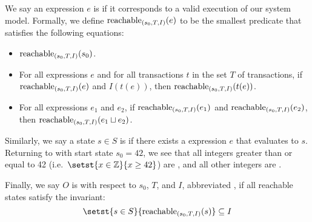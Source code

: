 We say an expression $e$ is  if it corresponds to a
valid execution of our system model. Formally, we define
$\text{reachable}_{(s_0, T, I)}(e)$ to be the smallest predicate that satisfies the
following equations:
\begin{itemize}
  \item
    $\text{reachable}_{(s_0, T, I)}(s_0)$.
  \item
    For all expressions $e$ and for all transactions $t$ in the set $T$ of
    transactions, if $\text{reachable}_{(s_0, T, I)}(e)$ and $I(t(e))$, then
    $\text{reachable}_{(s_0, T, I)}(t(e))$.
  \item
    For all expressions $e_1$ and $e_2$, if $\text{reachable}_{(s_0, T, I)}(e_1)$ and
    $\text{reachable}_{(s_0, T, I)}(e_2)$, then $\text{reachable}_{(s_0, T, I)}(e_1 \sqcup
    e_2)$.
\end{itemize}
Similarly, we say a state $s \in S$ is \sTIreachable{} if there exists a
\sTIreachable{} expression $e$ that evaluates to $s$. Returning to
 with start state $s_0 = 42$, we see that all integers greater
than or equal to 42 (i.e.\ $\setst{x \in \ints}{x \geq 42}$) are
\sTIreachable{}, and all other integers are \sTIunreachable{}.

Finally, we say $O$ is  with respect to $s_0$,
$T$, and $I$, abbreviated , if all reachable states
satisfy the invariant:
\[
  \setst{s \in S}{\sTIreachablepredicate{s}} \subseteq I
\]
